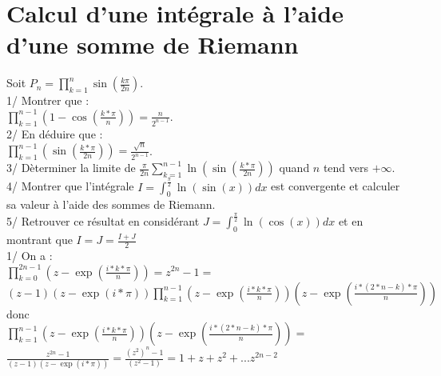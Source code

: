 \documentclass[a4paper,11pt]{book}
\begin{document}
\section{ Calcul d'une int\'egrale \`a l'aide d'une somme de Riemann}
Soit $\displaystyle P_n=\prod_{k=1}^n \sin(\frac{k\pi}{2n})$.\\
1/ Montrer que :\\
$\displaystyle \prod_{k=1}^{n-1}(1-\cos(\frac{k*\pi}{n}))=\frac{n}{2^{n-1}}$.\\
2/ En d\'eduire que :\\
$\displaystyle \prod_{k=1}^{n-1}(\sin(\frac{k*\pi}{2n}))=\frac{\sqrt n}{2^{n-1}}$.\\
3/ D\`eterminer la limite de 
$\displaystyle \frac{\pi}{2n}\sum_{k=1}^{n-1} \ln(\sin(\frac{k*\pi}{2n}))$ quand $n$ tend vers $+\infty$.\\
4/ Montrer que l'int\'egrale $I=\int_0^{\frac{\pi}{2}}\ln(\sin(x))dx$ est convergente et calculer sa valeur \`a l'aide des sommes de Riemann.\\
5/ Retrouver ce r\'esultat  en consid\'erant $J=\int_0^{\frac{\pi}{2}}\ln(\cos(x))dx$ et en montrant que $I=J=\frac{I+J}{2}$\\

1/ On a :\\
$\displaystyle \prod_{k=0}^{2n-1}(z-\exp(\frac{i*k*\pi}{n}))=z^{2n}-1=$\\
$\displaystyle (z-1)(z-\exp(i*\pi))\prod_{k=1}^{n-1}(z-\exp(\frac{i*k*\pi}{n}))(z-\exp(\frac{i*(2*n-k)*\pi}{n}))$ donc\\
$\displaystyle \prod_{k=1}^{n-1}(z-\exp(\frac{i*k*\pi}{n}))(z-\exp(\frac{i*(2*n-k)*\pi}{n}))=$\\$\displaystyle \frac{z^{2n}-1}{(z-1)(z-\exp(i*\pi))}=\frac{{(z^2)}^n-1}{(z^2-1)}=1+z+z^2+...z^{2n-2}$\\
\end{document}
